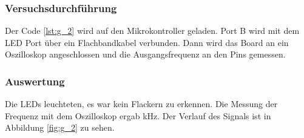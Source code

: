 \documentclass[12pt,a4paper]{article}
\begin{document}
\subsubsection*{Versuchsdurchführung}

Der Code \ref{lst:g_2} wird auf den Mikrokontroller geladen. Port B wird mit dem LED Port über ein Flachbandkabel verbunden. Dann wird das Board an ein Oszilloskop angeschlossen und die Ausgangsfrequenz an den Pins gemessen.

\subsubsection*{Auswertung}

Die LEDs leuchteten, es war kein Flackern zu erkennen. Die Messung der Frequenz mit dem Oszilloskop ergab \unit[28,9]{kHz}. Der Verlauf des Signals ist in Abbildung \ref{fig:g_2} zu sehen.
\end{document}
